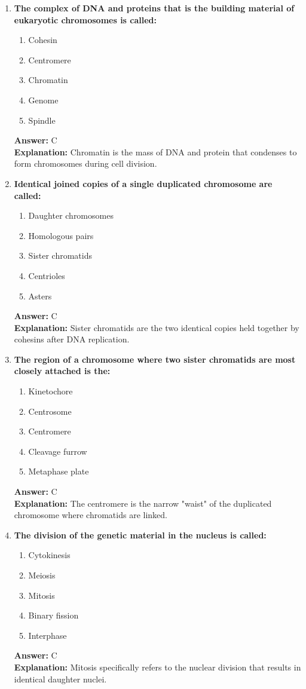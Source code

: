 \documentclass[11pt, a4paper]{article}
\begin{document}
\begin{enumerate}[leftmargin=*, label=\arabic*.]
\item \textbf{The complex of DNA and proteins that is the building material of eukaryotic chromosomes is called:}
\begin{enumerate}[label=\Alph*.]
\item Cohesin
\item Centromere
\item Chromatin
\item Genome
\item Spindle
\end{enumerate}
\textbf{Answer:} C \\
\textbf{Explanation:} Chromatin is the mass of DNA and protein that condenses to form chromosomes during cell division.

\item \textbf{Identical joined copies of a single duplicated chromosome are called:}
\begin{enumerate}[label=\Alph*.]
\item Daughter chromosomes
\item Homologous pairs
\item Sister chromatids
\item Centrioles
\item Asters
\end{enumerate}
\textbf{Answer:} C \\
\textbf{Explanation:} Sister chromatids are the two identical copies held together by cohesins after DNA replication.

\item \textbf{The region of a chromosome where two sister chromatids are most closely attached is the:}
\begin{enumerate}[label=\Alph*.]
\item Kinetochore
\item Centrosome
\item Centromere
\item Cleavage furrow
\item Metaphase plate
\end{enumerate}
\textbf{Answer:} C \\
\textbf{Explanation:} The centromere is the narrow "waist" of the duplicated chromosome where chromatids are linked.

\item \textbf{The division of the genetic material in the nucleus is called:}
\begin{enumerate}[label=\Alph*.]
\item Cytokinesis
\item Meiosis
\item Mitosis
\item Binary fission
\item Interphase
\end{enumerate}
\textbf{Answer:} C \\
\textbf{Explanation:} Mitosis specifically refers to the nuclear division that results in identical daughter nuclei.


\end{enumerate}
\end{document}
